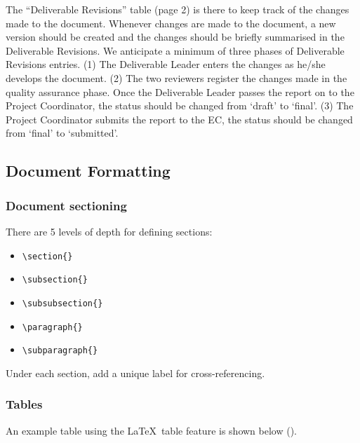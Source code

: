 The ``Deliverable Revisions'' table (page 2) is there to keep track of the changes made to the document. Whenever changes are made to the document, a new version should be created and the changes should be briefly summarised in the Deliverable Revisions. We anticipate a minimum of three phases of Deliverable Revisions entries. (1) The Deliverable Leader enters the changes as he/she develops the document. (2) The two reviewers register the changes made in the quality assurance phase. Once the Deliverable Leader passes the report on to the Project Coordinator, the status should be changed from ‘draft’ to ‘final’. (3) The Project Coordinator submits the report to the EC, the status should be changed from ‘final’ to ‘submitted’.

\subsection{Document Formatting}
\label{sec:document-formatting}

\subsubsection{Document sectioning}
\label{sec:headings}


There are 5 levels of depth for defining sections:

\begin{itemize}
    \item \texttt{\textbackslash section\{\}}
    \item \texttt{\textbackslash subsection\{\}}
    \item \texttt{\textbackslash subsubsection\{\}}
    \item \texttt{\textbackslash paragraph\{\}}
    \item \texttt{\textbackslash subparagraph\{\}}
\end{itemize}

Under each section, add a unique label for cross-referencing. 


\subsubsection{Tables}
\label{sec:tables}

An example table using the \LaTeX\ table feature is shown below ().

